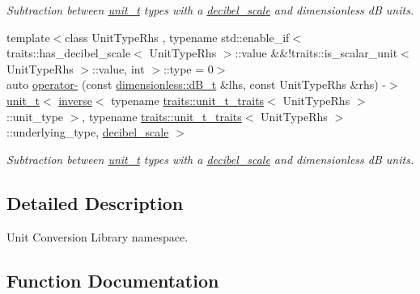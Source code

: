\begin{DoxyCompactItemize}
\begin{DoxyCompactList}\small\item\em Subtraction between \hyperlink{classunits_1_1unit__t}{unit\+\_\+t} types with a \hyperlink{structunits_1_1decibel__scale}{decibel\+\_\+scale} and dimensionless d\+B units. \end{DoxyCompactList}\item 
\hypertarget{namespaceunits_a24c569dc5b4fe1aca6ff343e77886b90}{}{\footnotesize template$<$class Unit\+Type\+Rhs , typename std\+::enable\+\_\+if$<$ traits\+::has\+\_\+decibel\+\_\+scale$<$ Unit\+Type\+Rhs $>$\+::value \&\&!traits\+::is\+\_\+scalar\+\_\+unit$<$ Unit\+Type\+Rhs $>$\+::value, int $>$\+::type  = 0$>$ }\\auto \hyperlink{namespaceunits_a24c569dc5b4fe1aca6ff343e77886b90}{operator-\/} (const \hyperlink{classunits_1_1unit__t}{dimensionless\+::d\+B\+\_\+t} \&lhs, const Unit\+Type\+Rhs \&rhs) -\/$>$ \hyperlink{classunits_1_1unit__t}{unit\+\_\+t}$<$ \hyperlink{group___unit_manipulators_gaacc539ef162e24b260d023d3ff949b57}{inverse}$<$ typename \hyperlink{structunits_1_1traits_1_1unit__t__traits}{traits\+::unit\+\_\+t\+\_\+traits}$<$ Unit\+Type\+Rhs $>$\+::unit\+\_\+type $>$, typename \hyperlink{structunits_1_1traits_1_1unit__t__traits}{traits\+::unit\+\_\+t\+\_\+traits}$<$ Unit\+Type\+Rhs $>$\+::underlying\+\_\+type, \hyperlink{structunits_1_1decibel__scale}{decibel\+\_\+scale} $>$\label{namespaceunits_a24c569dc5b4fe1aca6ff343e77886b90}

\begin{DoxyCompactList}\small\item\em Subtraction between \hyperlink{classunits_1_1unit__t}{unit\+\_\+t} types with a \hyperlink{structunits_1_1decibel__scale}{decibel\+\_\+scale} and dimensionless d\+B units. \end{DoxyCompactList}\end{DoxyCompactItemize}


\subsection{Detailed Description}
Unit Conversion Library namespace. 

\subsection{Function Documentation}
\hypertarget{namespaceunits_a3d67221c61e6c955fb24dd97053cb0ba}{}

